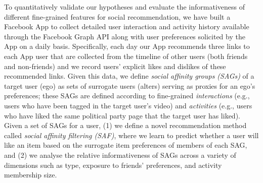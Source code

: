 To quantitatively validate our hypotheses and evaluate the
informativeness of different fine-grained features for social
recommendation, we have built a Facebook App to collect detailed user
interaction and activity history available through the Facebook Graph
API along with user preferences solicited by the App on a daily basis.
Specifically, each day our App recommends three links to each App user
that are collected from the timeline of other users (both friends and
non-friends) and we record users' explicit likes and dislikes of these
recommended links.  Given this data, we define \emph{social affinity
groups (SAGs)} of a target user (ego) as sets of surrogate users
(alters) serving as proxies for an ego's preferences; these SAGs are
defined according to fine-grained
\emph{interactions} (e.g., users who have been tagged in the target user's
video) and \emph{activities} (e.g., users who have liked the same
political party page that the target user has liked).  Given a set of
SAGs for a user, (1) we define a novel recommendation method called
{\em social affinity filtering (SAF)}, where we learn to predict
whether a user will like an item based on the surrogate item
preferences of members of each SAG, and (2) we analyse the relative
informativeness of SAGs across a variety of dimensions such as type,
exposure to friends' preferences, and activity membership size.

